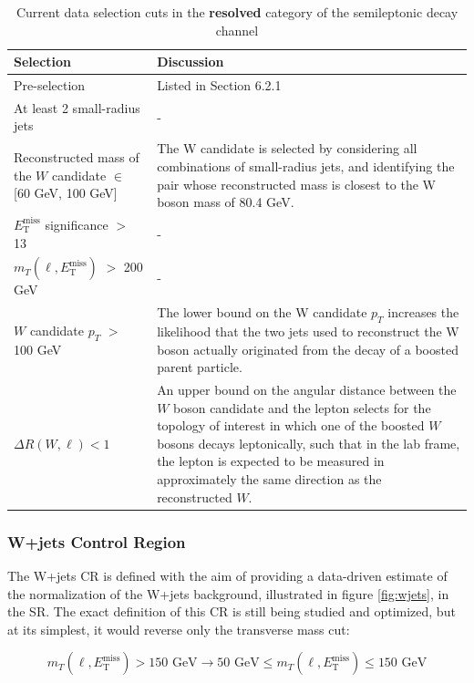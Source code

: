\documentclass[12pt]{article}
\newcommand*{\met}{\ensuremath{E_\text{T}^\text{miss}} }
\begin{document}
\begin{table}[H]
\centering
\caption{Current data selection cuts in the \textbf{resolved} category of the semileptonic decay channel}
\label{tab:resolved_cuts}
\begin{footnotesize}
\renewcommand{\arraystretch}{1.5}
\begin{tabular}{|p{50mm}|p{100mm}|}
\hline
\textbf{Selection} & \textbf{Discussion}  \\ \hline
Pre-selection & Listed in Section 6.2.1      \\ \hline
At least 2 small-radius jets & -     \\ \hline
Reconstructed mass of the $W$ candidate $\in$ [60 GeV, 100 GeV]     & The W candidate is selected by considering all combinations of small-radius jets, and identifying the pair whose reconstructed mass is closest to the W boson mass of 80.4 GeV.        \\ \hline
\met significance $>$ 13    & -        \\ \hline
$m_T(\ell, \met)$ $>$ 200 GeV    & -        \\ \hline
 $W$ candidate $p_T$ $>$ 100 GeV    & The lower bound on the W candidate $p_T$ increases the likelihood that the two jets used to reconstruct the W boson actually originated from the decay of a boosted parent particle.   \\ \hline
$\Delta R(W, \ell) < 1$   & An upper bound on the angular distance between the $W$ boson candidate and the lepton selects for the topology of interest in which one of the boosted $W$ bosons decays leptonically, such that in the lab frame, the lepton is expected to be measured in approximately the same direction as the reconstructed $W$.   \\ \hline
\end{tabular}
\end{footnotesize}
\end{table}

\subsubsection{W+jets Control Region}

The W+jets CR is defined with the aim of providing a data-driven estimate of the normalization of the W+jets background, illustrated in figure \ref{fig:wjets}, in the SR. The exact definition of this CR is still being studied and optimized, but at its simplest, it would reverse only the transverse mass cut: 

$$
m_T(\ell, \met)>150\text{ GeV} \rightarrow 50\text{ GeV} \leq m_T(\ell, \met)\leq 150\text{ GeV}
$$
\end{document}

